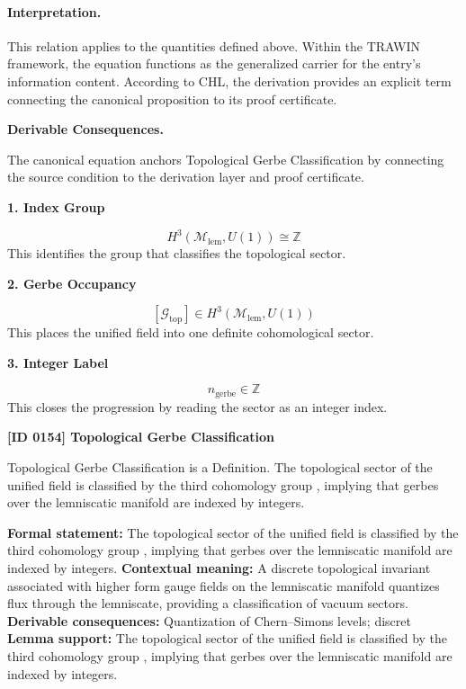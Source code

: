 \paragraph{Interpretation.}
This relation applies to the quantities defined above. Within the TRAWIN framework, the equation functions as the generalized carrier for the entry’s information content. According to CHL, the derivation provides an explicit term connecting the canonical proposition to its proof certificate.

\par\vspace{0.35em}
\noindent\textbf{Derivable Consequences.}\quad
\begingroup
\footnotesize
\raggedright
The canonical equation anchors Topological Gerbe Classification by connecting the source condition to the derivation layer and proof certificate.
\par\endgroup

\noindent\textbf{1. Index Group}\par
\[
H^3(\mathcal{M}_{\mathrm{lem}},U(1))\cong \mathbb{Z}
\]
\noindent This identifies the group that classifies the topological sector.\par
\noindent\textbf{2. Gerbe Occupancy}\par
\[
[\mathcal{G}_{\mathrm{top}}]\in H^3(\mathcal{M}_{\mathrm{lem}},U(1))
\]
\noindent This places the unified field into one definite cohomological sector.\par
\noindent\textbf{3. Integer Label}\par
\[
n_{\mathrm{gerbe}}\in \mathbb{Z}
\]
\noindent This closes the progression by reading the sector as an integer index.\par

\clearpage
\noindent\textbf{[ID 0154] Topological Gerbe Classification}\par
\vspace{0.35em}
\begingroup\small
{}
Topological Gerbe Classification is a Definition. The topological sector of the unified field is classified by the third cohomology group , implying that gerbes over the lemniscatic manifold are indexed by integers.  

\begingroup\footnotesize\setlength{\emergencystretch}{3em}\sloppy
\textbf{Formal statement:} The topological sector of the unified field is classified by the third cohomology group , implying that gerbes over the lemniscatic manifold are indexed by integers.  
\textbf{Contextual meaning:} A discrete topological invariant associated with higher form gauge fields on the lemniscatic manifold quantizes flux through the lemniscate, providing a classification of vacuum sectors.
\textbf{Derivable consequences:} Quantization of Chern--Simons levels; discret
\textbf{Lemma support:} The topological sector of the unified field is classified by the third cohomology group , implying that gerbes over the lemniscatic manifold are indexed by integers.  \par
\endgroup

